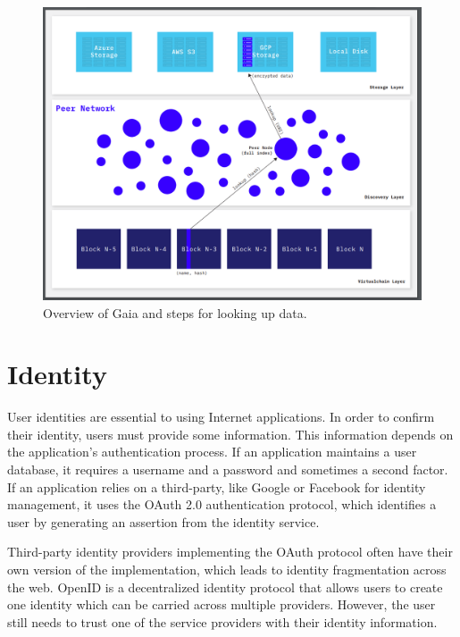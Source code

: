 		\begin{figure}[h]
			\includegraphics[width=\linewidth]{figures/gaia-overview}
			\caption{\label{fig:gaia-overview} Overview of Gaia and steps for looking up data.\protect\cite{blockstack2019whitepaper}}
		\end{figure}
		
\cleardoublepage
\section{Identity}
	User identities are essential to using Internet applications. In order to confirm their identity, users must provide some information. This information depends on the application's authentication process. If an application maintains a user database, it requires a username and a password and sometimes a second factor. If an application relies on a third-party, like Google\cite{identity:google:1} or Facebook\cite{identity:facebook:1} for identity management, it uses the OAuth 2.0 authentication\cite{rfc6749} protocol, which identifies a user by generating an assertion from the identity service.
	
	Third-party identity providers implementing the OAuth protocol often have their own version of the implementation, which leads to identity fragmentation across the web. OpenID\cite{recordon2006openid} is a decentralized identity protocol that allows users to create one identity which can be carried across multiple providers. However, the user still needs to trust one of the service providers with their identity information\cite{raval2016decentralized}.
	
